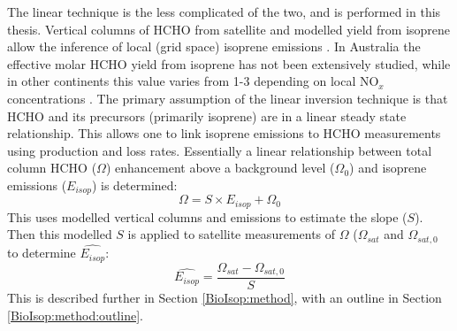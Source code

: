       The linear technique is the less complicated of the two, and is performed in this thesis.
      Vertical columns of HCHO from satellite and modelled yield from isoprene allow the inference of local (grid space) isoprene emissions \parencite{Palmer2003, Millet2006,Marais2012,Bauwens2016}.
      In Australia the effective molar HCHO yield from isoprene has not been extensively studied, while in other continents this value varies from 1-3 depending on local NO$_x$ concentrations \parencite[e.g.][]{Palmer2006, Millet2006, Bauwens2016, Surl2018}.
      The primary assumption of the linear inversion technique is that HCHO and its precursors (primarily isoprene) are in a linear steady state relationship.
      This allows one to link isoprene emissions to HCHO measurements using production and loss rates.
      Essentially a linear relationship between total column HCHO ($\Omega$) enhancement above a background level ($\Omega_0$) and isoprene emissions ($E_{isop}$) is determined:
      \begin{equation*}
        \Omega = S \times E_{isop} + \Omega_0
      \end{equation*}
      This uses modelled vertical columns and emissions to estimate the slope ($S$).
      Then this modelled $S$ is applied to satellite measurements of $\Omega$ ($\Omega_{sat}$ and $\Omega_{sat,0}$ to determine $\hat{E_{isop}}$:
      \begin{equation*}
        \hat{E_{isop}} = \frac{\Omega_{sat} - \Omega_{sat,0}}{S}
      \end{equation*}
      This is described further in Section \ref{BioIsop:method}, with an outline in Section \ref{BioIsop:method:outline}.
      
